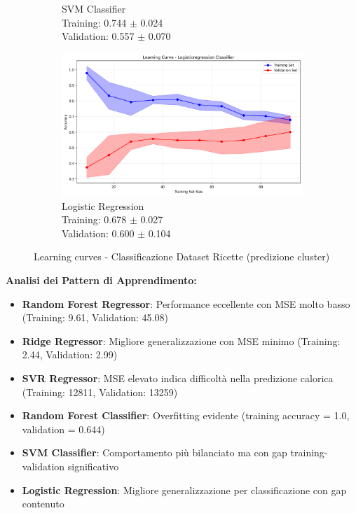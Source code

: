 \documentclass[12pt,a4paper]{article}
\begin{document}
\begin{figure}[H]
\begin{subfigure}{0.32\textwidth}
    \caption{SVM Classifier\\Training: 0.744 $\pm$ 0.024\\Validation: 0.557 $\pm$ 0.070}
\end{subfigure}
\hfill
\begin{subfigure}{0.32\textwidth}
    \includegraphics[width=\textwidth]{dati/learning_curve_ricette_logisticregression_classifier.png}
    \caption{Logistic Regression\\Training: 0.678 $\pm$ 0.027\\Validation: 0.600 $\pm$ 0.104}
\end{subfigure}
\caption{Learning curves - Classificazione Dataset Ricette (predizione cluster)}
\label{fig:learning_curves_classification}
\end{figure}

\textbf{Analisi dei Pattern di Apprendimento:}

\begin{itemize}
    \item \textbf{Random Forest Regressor}: Performance eccellente con MSE molto basso (Training: 9.61, Validation: 45.08)
    \item \textbf{Ridge Regressor}: Migliore generalizzazione con MSE minimo (Training: 2.44, Validation: 2.99)
    \item \textbf{SVR Regressor}: MSE elevato indica difficoltà nella predizione calorica (Training: 12811, Validation: 13259)
    \item \textbf{Random Forest Classifier}: Overfitting evidente (training accuracy = 1.0, validation = 0.644)
    \item \textbf{SVM Classifier}: Comportamento più bilanciato ma con gap training-validation significativo  
    \item \textbf{Logistic Regression}: Migliore generalizzazione per classificazione con gap contenuto
\end{itemize}
\end{document}
